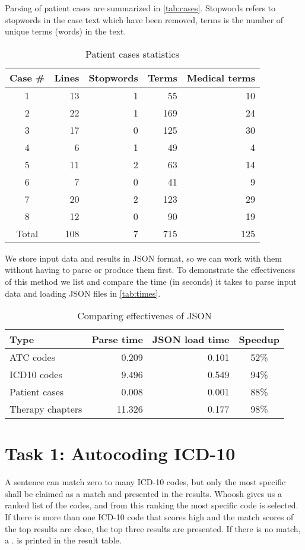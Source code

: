 Parsing of patient cases are summarized in \autoref{tab:cases}. Stopwords
refers to stopwords in the case text which have been removed, terms is the
number of unique terms (words) in the text.
\begin{table}[htbp] \footnotesize \center
\caption{Patient cases statistics\label{tab:cases}}
\begin{tabular}{c r r r r}
    \toprule
	Case \# & Lines & Stopwords & Terms & Medical terms \\
    \midrule
	1 & 13 & 1 & 55 & 10 \\
	2 & 22 & 1 & 169 & 24 \\
	3 & 17 & 0 & 125 & 30 \\
	4 & 6 & 1 & 49 & 4 \\
	5 & 11 & 2 & 63 & 14 \\
	6 & 7 & 0 & 41 & 9 \\
	7 & 20 & 2 & 123 & 29 \\
	8 & 12 & 0 & 90 & 19 \\
    \midrule
	Total & 108 & 7 & 715 & 125 \\
	\bottomrule
\end{tabular}
\end{table}

We store input data and results in JSON format, so we can work with them
without having to parse or produce them first. To demonstrate the
effectiveness of this method we list and compare the time (in seconds) it
takes to parse input data and loading JSON files in \autoref{tab:times}.
\begin{table}[htbp] \footnotesize \center
\caption{Comparing effectivenes of JSON\label{tab:times}}
\begin{tabular}{l r r c}
    \toprule
    Type & Parse time & JSON load time & Speedup \\
    \midrule
	ATC codes & 0.209 & 0.101 & 52\% \\
	ICD10 codes & 9.496 & 0.549 & 94\% \\
	Patient cases & 0.008 & 0.001 & 88\% \\
	Therapy chapters & 11.326 & 0.177 & 98\% \\
	\bottomrule
\end{tabular}
\end{table}


\section{Task 1: Autocoding ICD-10}
A sentence can match zero to many ICD-10 codes, but only the most specific shall be claimed as a match and presented in the results. Whoosh gives us a ranked list of the codes, and from this ranking the most specific code is selected. If there is more than one ICD-10 code that scores high and the match scores of the top results are close, the top three results are presented. If there is no match, a . is printed in the result table. 

